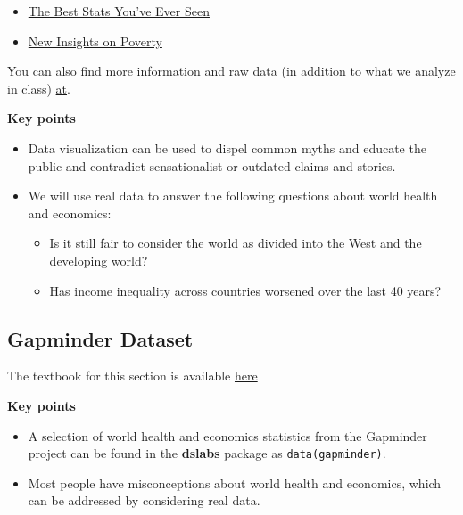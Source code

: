 \documentclass[
]{article}
\providecommand{\tightlist}{%
  \setlength{\itemsep}{0pt}\setlength{\parskip}{0pt}}
\begin{document}
\begin{itemize}
\tightlist
\item
  \href{https://www.ted.com/talks/hans_rosling_the_best_stats_you_ve_ever_seen?language=en}{The
  Best Stats You've Ever Seen}
\item
  \href{https://www.ted.com/talks/hans_rosling_new_insights_on_poverty?language=en}{New
  Insights on Poverty}
\end{itemize}

You can also find more information and raw data (in addition to what we
analyze in class) \href{https://www.gapminder.org/}{at}.

\textbf{Key points}

\begin{itemize}
\tightlist
\item
  Data visualization can be used to dispel common myths and educate the
  public and contradict sensationalist or outdated claims and stories.
\item
  We will use real data to answer the following questions about world
  health and economics:

  \begin{itemize}
  \tightlist
  \item
    Is it still fair to consider the world as divided into the West and
    the developing world?
  \item
    Has income inequality across countries worsened over the last 40
    years?
  \end{itemize}
\end{itemize}

\hypertarget{gapminder-dataset}{%
\subsection{Gapminder Dataset}\label{gapminder-dataset}}

The textbook for this section is available
\href{https://rafalab.github.io/dsbook/gapminder.html\#case-study-new-insights-on-poverty}{here}

\textbf{Key points}

\begin{itemize}
\tightlist
\item
  A selection of world health and economics statistics from the
  Gapminder project can be found in the \textbf{dslabs} package as
  \texttt{data(gapminder)}.
\item
  Most people have misconceptions about world health and economics,
  which can be addressed by considering real data.
\end{itemize}
\end{document}
